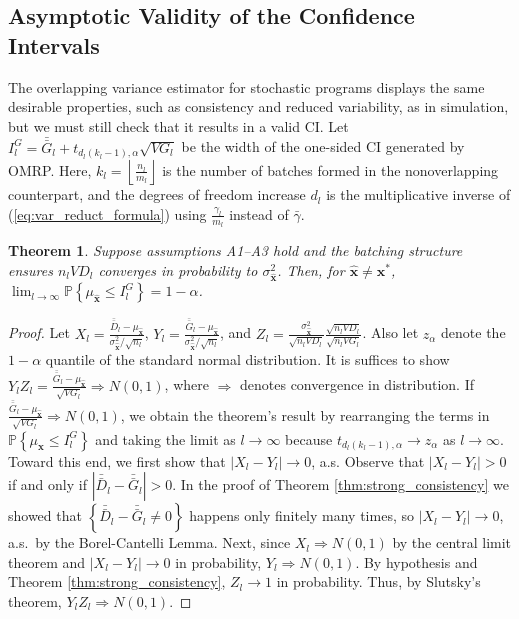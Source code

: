 \documentclass[12pt]{article}
\newtheorem{theorem}{Theorem}
\newcommand{\p}[1]{\mathbb{P} \left\{ #1 \right\}}
\newcommand{\x}{\mathbf{x}}
\newcommand{\xh}{{\hat{\x}}}
\newcommand{\xs}{\x^*}
\newcommand{\gammab}{\bar{\gamma}}
\newcommand{\gb}{\bar{G}}
\newcommand{\gbb}{\bar{\gb}}
\newcommand{\db}{\bar{D}}
\newcommand{\dbb}{\bar{\db}}
\begin{document}
\subsection{Asymptotic Validity of the Confidence Intervals}
\label{ssec:validity}

The overlapping variance estimator for stochastic programs displays the same desirable properties, such as consistency and reduced variability, as in simulation, but we must still check that it results in a valid CI.  
Let $I^G_l = \gbb_l + t_{d_l \left( k_l-1\right),\alpha} \sqrt{VG_l}$ be the width of the one-sided CI generated by OMRP. 
Here, $k_l= \left\lfloor\frac{n_l}{m_l}\right\rfloor $ is the number of batches formed in the nonoverlapping counterpart, and the degrees of freedom increase $d_l$ is the multiplicative inverse of (\ref{eq:var_reduct_formula}) using $\frac{\gamma_l}{m_l}$ instead of $\gammab$.

\begin{theorem} \label{thm:conf_int}
	Suppose assumptions A1--A3 hold and the batching structure ensures $n_l VD_l$ converges in probability to $\sigma^2_\xh$.  
        Then, for $\xh \neq \xs$, $\lim_{l\rightarrow\infty} \p{\mu_\xh \leq I^G_l} = 1 - \alpha$.
\end{theorem}

\begin{proof} 
			Let $X_l = \frac{\dbb_l - \mu_\xh}{\sigma^2_\xh/\sqrt{n_l}}$, $Y_l = \frac{\gbb_l - \mu_\xh}{\sigma^2_\xh/\sqrt{n_l}}$, and $Z_l = \frac{\sigma^2_\xh}{\sqrt{n_lVD_l}} \frac{\sqrt{n_lVD_l}}{\sqrt{n_lVG_l}}$. 
			Also let $z_{\alpha}$ denote the $1-\alpha$ quantile of the standard normal distribution. 
        It is suffices to show $Y_lZ_l = \frac{\gbb_l - \mu_\xh}{\sqrt{VG_l}} \Rightarrow N(0,1)$, where $\Rightarrow$ denotes convergence in distribution.
			If $\frac{\gbb_l - \mu_\xh}{\sqrt{VG_l}} \Rightarrow N(0,1)$, we obtain the theorem's result by rearranging the terms in $\p{\mu_\xh \leq I^G_l}$ and taking the limit as $l \rightarrow \infty$ because $t_{d_l(k_l -1),\alpha} \rightarrow z_{\alpha}$ as $l \rightarrow \infty$.
        Toward this end, we first show that $|X_l - Y_l| \rightarrow 0$, a.s.  
		  Observe that $|X_l - Y_l| > 0$ if and only if $|\dbb_l - \gbb_l| > 0$.  
        In the proof of Theorem \ref{thm:strong_consistency} we showed that $\left\{ \dbb_l - \gbb_l \neq 0 \right\}$ happens only finitely many times, so $|X_l - Y_l| \rightarrow 0$, a.s.\ by the Borel-Cantelli Lemma. 
        Next, since $X_l \Rightarrow N(0,1)$  by the central limit theorem and $|X_l - Y_l| \rightarrow 0$ in probability, $Y_l \Rightarrow N(0,1)$.  
        By hypothesis and Theorem \ref{thm:strong_consistency}, $Z_l \rightarrow 1$ in probability.  
        Thus, by Slutsky's theorem, $Y_lZ_l \Rightarrow N(0,1)$.
\end{proof}
\end{document}
